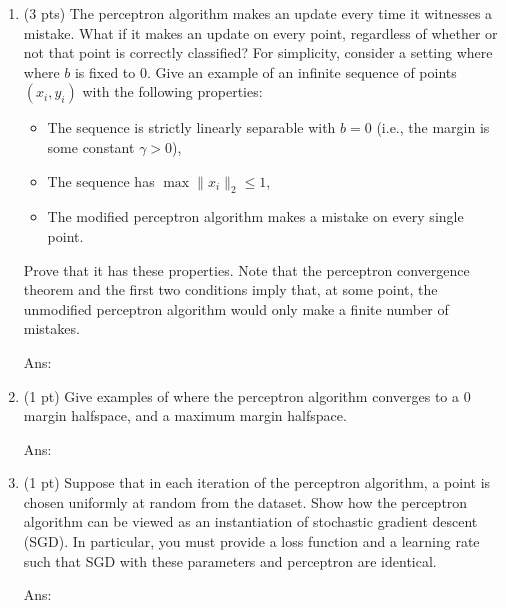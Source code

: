 \documentclass[10pt,letter,notitlepage]{article}
\newcommand{\ans}[1]{{\color{orange}\textsf{Ans}: #1}}
\newcounter{exercise}
\begin{document}
\begin{exercise}
  \begin{enumerate}
    \item (3 pts) The perceptron algorithm makes an update every time it witnesses a mistake.
      What if it makes an update on every point, regardless of whether or not that point is correctly classified? 
      For simplicity, consider a setting where where $b$ is fixed to $0$.
      Give an example of an infinite sequence of points $(x_i, y_i)$ with the following properties:
    \begin{itemize}
      \item The sequence is strictly linearly separable with $b = 0$ (i.e., the margin is some constant $\gamma > 0$),
      \item The sequence has $\max \|x_i\|_2 \leq 1$,
      \item The modified perceptron algorithm makes a mistake on every single point.
    \end{itemize}
    Prove that it has these properties.
      Note that the perceptron convergence theorem and the first two conditions imply that, at some point, the unmodified perceptron algorithm would only make a finite number of mistakes.

\ans{}

  \item (1 pt) Give examples of where the perceptron algorithm converges to a 0 margin halfspace, and a maximum margin halfspace.
    
\ans{} 
  \item (1 pt) Suppose that in each iteration of the perceptron algorithm, a point is chosen uniformly at random from the dataset.
    Show how the perceptron algorithm can be viewed as an instantiation of stochastic gradient descent (SGD). 
      In particular, you must provide a loss function and a learning rate such that SGD with these parameters and perceptron are identical. 

      \ans{} 
  \end{enumerate}
\end{exercise}
\end{document}
